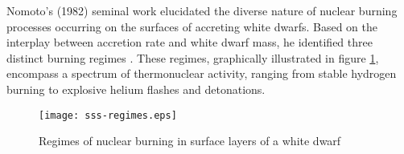         	Nomoto's (1982) seminal work elucidated the diverse nature of nuclear burning processes occurring on the surfaces of accreting white dwarfs. Based on the interplay between accretion rate and white dwarf mass, he identified three distinct burning regimes \cite{nomoto82}. These regimes, graphically illustrated in figure \ref{fig:regimes-wd}, encompass a spectrum of thermonuclear activity, ranging from stable hydrogen burning to explosive helium flashes and detonations.
        	
        	\begin{figure}[h!]
        		\begin{center}
        			\texttt{[image: sss-regimes.eps]}
        			\caption{Regimes of nuclear burning in surface layers of a white dwarf \cite{nomoto82}}
        			\label{fig:regimes-wd}
        		\end{center}
        	\end{figure}
        	
